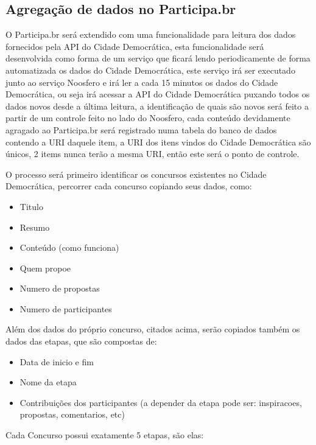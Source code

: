\documentclass[12pt]{article}
\begin{document}
\subsection{Agregação de dados no Participa.br}

O Participa.br será extendido com uma funcionalidade para leitura dos dados
fornecidos pela API do Cidade Democrática, esta funcionalidade será
desenvolvida como forma de um serviço que ficará lendo periodicamente de forma
automatizada os dados do Cidade Democrática, este serviço irá ser executado
junto ao serviço Noosfero e irá ler a cada 15 minutos os dados do Cidade
Democrática, ou seja irá acessar a API do Cidade Democrática puxando todos os
dados novos desde a última leitura, a identificação de quais são novos será
feito a partir de um controle feito no lado do Noosfero, cada conteúdo
devidamente agragado ao Participa.br será registrado numa tabela do banco de
dados contendo a URI daquele item, a URI dos itens vindos do Cidade
Democrática são únicos, 2 items nunca terão a mesma URI, então este será o
ponto de controle.

O processo será primeiro identificar os concursos existentes no Cidade
Democrática, percorrer cada concurso copiando seus dados, como:

\begin{itemize}
  \item Titulo
  \item Resumo
  \item Conteúdo (como funciona)
  \item Quem propoe
  \item Numero de propostas
  \item Numero de participantes
\end{itemize}

Além dos dados do próprio concurso, citados acima, serão copiados também os
dados das etapas, que são compostas de:

\begin{itemize}
  \item Data de inicio e fim
  \item Nome da etapa
  \item Contribuições dos participantes (a depender da etapa pode ser: inspiracoes, propostas, comentarios, etc)
\end{itemize}

Cada Concurso possui exatamente 5 etapas, são elas:
\end{document}
